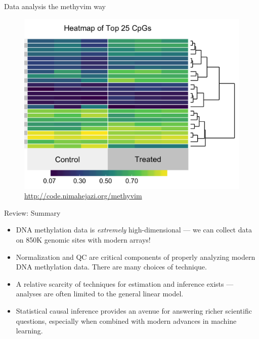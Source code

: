 \documentclass[12pt,t,handout]{beamer}
\begin{document}
\begin{frame}[c]{Data analysis the methyvim way}

\begin{figure}[H]
  \centering
  \includegraphics[scale=0.25]{heatmap_methyvim}
  \caption{
    \url{http://code.nimahejazi.org/methyvim}
  }
\end{figure}


\end{frame}


\begin{frame}[c]{Review: Summary}

\begin{center}
\begin{itemize}
  \itemsep10pt
  \item DNA methylation data is \textit{extremely} high-dimensional --- we can
    collect data on 850K genomic sites with modern arrays!
  \item Normalization and QC are critical components of properly analyzing
    modern DNA methylation data. There are many choices of technique.
  \item A relative scarcity of techniques for estimation and inference exists
    --- analyses are often limited to the general linear model.
  \item Statistical causal inference provides an avenue for answering richer
    scientific questions, especially when combined with modern advances in
    machine learning.
\end{itemize}
\end{center}


\end{frame}
\end{document}
